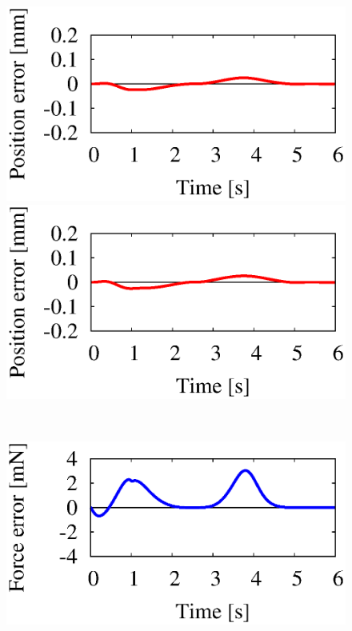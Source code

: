 %
\begin{figure}[t]
  \centering
  \begin{minipage}[h]{0.40\linewidth}
    \centering
    \includegraphics[width=1.0\linewidth]{fig/chapter6/results/planar/RNS/3RFIX_RNS_U06_pos_err.eps}
  \end{minipage}
  \begin{minipage}[h]{0.40\linewidth}
    \centering
    \includegraphics[width=1.0\linewidth]{fig/chapter6/results/planar/OSF/3RFIX_OSF_U06_pos_err.eps}
  \end{minipage}\\
  \vspace{-7mm}
  \begin{minipage}[h]{0.40\linewidth}
    \centering
    \includegraphics[width=1.0\linewidth]{fig/chapter6/results/planar/RNS/3RFIX_RNS_U08_force_err.eps}

\end{minipage}
\end{figure}
